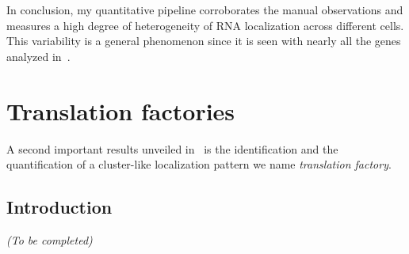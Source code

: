 In conclusion, my quantitative pipeline corroborates the manual observations and measures a high degree of heterogeneity of \ac{RNA} localization across different cells.
This variability is a general phenomenon since it is seen with nearly all the genes analyzed in~\cite{CHOUAIB_2020}.


\section{Translation factories}
\label{sec:translation_factories}

A second important results unveiled in~\cite{CHOUAIB_2020} is the identification and the quantification of a cluster-like localization pattern we name \emph{translation factory}.

\subsection{Introduction}
\label{subsec:introduction_translation_factories}

\begin{center}
	\textit{(To be completed)}
\end{center}



